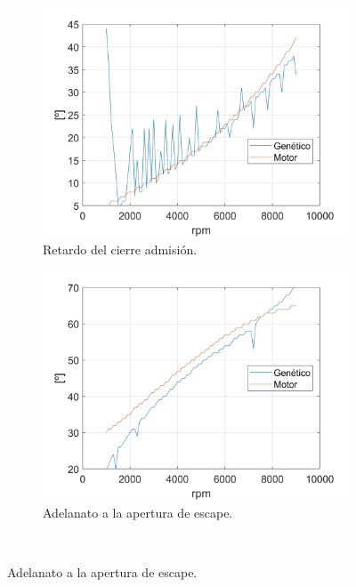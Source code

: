 \begin{figure}[H]
    \centering
    \begin{subfigure}[b]{0.45\textwidth}
        \centering
        \includegraphics[width=\linewidth]{Figures/01/opti_RCA.jpg}
        \caption{Retardo del cierre admisión.}
        \label{fig:opti_RCA}
    \end{subfigure}
    \hfill
    \begin{subfigure}[b]{0.45\textwidth}
        \centering
        \includegraphics[width=\linewidth]{Figures/01/opti_AAE.jpg}
        \caption{Adelanato a la apertura de escape.}
        \label{fig:opti_AAE}
    \end{subfigure}
    \\

\end{figure}
